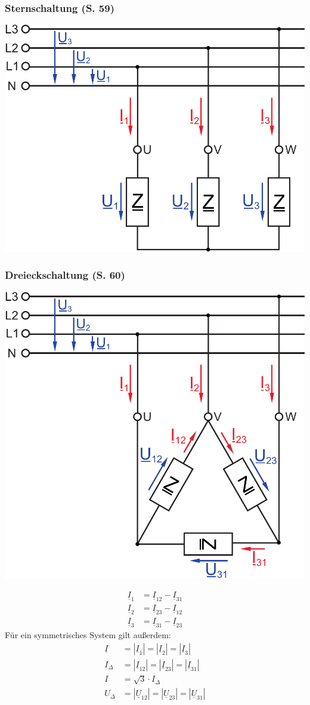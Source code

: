 \documentclass[a4paper,twocolumn,10pt]{article}
\begin{document}
\subsubsection{Sternschaltung (S. 59)}
\begin{center}
\includegraphics[width=0.5\columnwidth]{Grafiken/Sternschaltung}
\end{center}

\subsubsection{Dreieckschaltung (S. 60)}
\begin{center}
\includegraphics[width=0.5\columnwidth]{Grafiken/Dreieckschaltung}
\end{center}
\begin{equation*}
\begin{split}
\underline{I}_1&=\underline{I}_{12}-\underline{I}_{31}\\
\underline{I}_2&=\underline{I}_{23}-\underline{I}_{12}\\
\underline{I}_3&=\underline{I}_{31}-\underline{I}_{23}
\end{split}
\end{equation*}
Für ein symmetrisches System gilt außerdem:
\begin{equation*}
\begin{split}
\underline{I}&=|\underline{I}_1|=|\underline{I}_2|=|\underline{I}_3|\\
I_{\Delta}&=|\underline{I}_{12}|=|\underline{I}_{23}|=|\underline{I}_{31}|\\
I&=\sqrt{3}\cdot I_{\Delta}\\
U_{\Delta}&=|\underline{U}_{12}|=|\underline{U}_{23}|=|\underline{U}_{31}|
\end{split}
\end{equation*}
\end{document}
